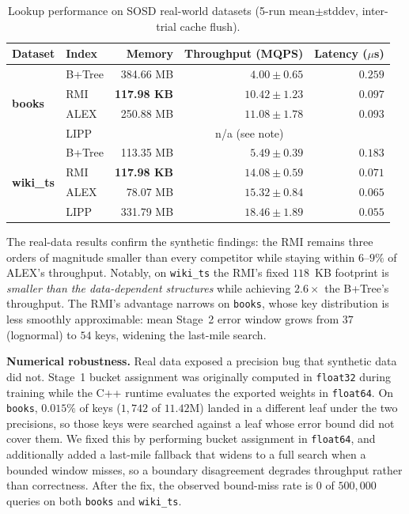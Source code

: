 \documentclass[sigconf, nonacm]{acmart}
\begin{document}
\begin{table}[t]
\centering
\caption{Lookup performance on SOSD real-world datasets (5-run mean$\pm$stddev, inter-trial cache flush).}
\label{tab:sosd}
\begin{tabular}{llrrr}
\toprule
\textbf{Dataset} & \textbf{Index} & \textbf{Memory} & \textbf{Throughput (MQPS)} & \textbf{Latency ($\mu$s)} \\
\midrule
\multirow{4}{*}{\textbf{books}}
 & B+Tree & 384.66 MB & $4.00 \pm 0.65$ & $0.259$ \\
 & RMI    & \textbf{117.98 KB} & $10.42 \pm 1.23$ & $0.097$ \\
 & ALEX   & 250.88 MB & $\mathbf{11.08 \pm 1.78}$ & $\mathbf{0.093}$ \\
 & LIPP   & \multicolumn{3}{c}{n/a (see note)} \\
\midrule
\multirow{4}{*}{\textbf{wiki\_ts}}
 & B+Tree & 113.35 MB & $5.49 \pm 0.39$ & $0.183$ \\
 & RMI    & \textbf{117.98 KB} & $14.08 \pm 0.59$ & $0.071$ \\
 & ALEX   & 78.07 MB  & $15.32 \pm 0.84$ & $0.065$ \\
 & LIPP   & 331.79 MB & $\mathbf{18.46 \pm 1.89}$ & $\mathbf{0.055}$ \\
\bottomrule
\end{tabular}
\end{table}

The real-data results confirm the synthetic findings: the RMI remains three orders of magnitude smaller than every competitor while staying within $6$--$9\%$ of ALEX's throughput. Notably, on \texttt{wiki\_ts} the RMI's fixed $118$~KB footprint is \textit{smaller than the data-dependent structures} while achieving $2.6\times$ the B+Tree's throughput. The RMI's advantage narrows on \texttt{books}, whose key distribution is less smoothly approximable: mean Stage~2 error window grows from $37$ (lognormal) to $54$ keys, widening the last-mile search.

\medskip
\noindent\textbf{Numerical robustness.} Real data exposed a precision bug that synthetic data did not. Stage~1 bucket assignment was originally computed in \texttt{float32} during training while the C++ runtime evaluates the exported weights in \texttt{float64}. On \texttt{books}, $0.015\%$ of keys ($1{,}742$ of $11.42$M) landed in a different leaf under the two precisions, so those keys were searched against a leaf whose error bound did not cover them. We fixed this by performing bucket assignment in \texttt{float64}, and additionally added a last-mile fallback that widens to a full search when a bounded window misses, so a boundary disagreement degrades throughput rather than correctness. After the fix, the observed bound-miss rate is $0$ of $500{,}000$ queries on both \texttt{books} and \texttt{wiki\_ts}.
\end{document}
